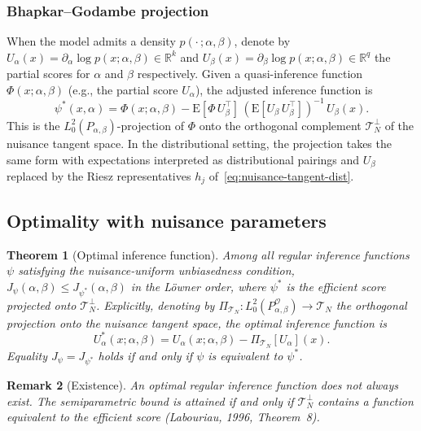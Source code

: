 \documentclass[11pt,a4paper]{article}
\newtheorem{theorem}{Theorem}[section]
\newtheorem{remark}[theorem]{Remark}
\newcommand{\E}{\mathrm{E}}
\newcommand{\R}{\mathbb{R}}
\newcommand{\eg}{{e.g.}, }
\begin{document}
\subsubsection*{Bhapkar--Godambe projection}

When the model admits a density $p(\cdot\,; \alpha, \beta)$, denote by
$U_\alpha(x) = \partial_\alpha \log p(x; \alpha, \beta) \in \R^k$
and $U_\beta(x) = \partial_\beta \log p(x; \alpha, \beta) \in \R^q$
the partial scores for $\alpha$ and $\beta$ respectively.
Given a quasi-inference function $\Phi(x; \alpha, \beta)$ (\eg the
partial score $U_\alpha$), the adjusted inference function is
\[
\psi^*(x, \alpha)
= \Phi(x; \alpha, \beta)
- \E[\Phi\,U_\beta^\top]\,(\E[U_\beta\,U_\beta^\top])^{-1}\,U_\beta(x).
\]
This is the $L^2_0(P_{\alpha,\beta})$-projection of $\Phi$ onto the
orthogonal complement $\mathcal T_N^\perp$ of the nuisance tangent space.
In the distributional setting, the projection takes the same form with
expectations interpreted as distributional pairings and $U_\beta$ replaced
by the Riesz representatives $h_j$
of~\eqref{eq:nuisance-tangent-dist}.

\subsection{Optimality with nuisance parameters}\label{subsec:nuisance-optimal}

\begin{theorem}[Optimal inference function]\label{thm:optimal-nuisance}
Among all regular inference functions $\psi$ satisfying the
nuisance-uniform unbiasedness condition,
$J_\psi(\alpha, \beta) \leq J_{\psi^*}(\alpha, \beta)$
in the L\"owner order, where $\psi^*$ is the efficient score projected
onto $\mathcal T_N^\perp$.  Explicitly, denoting by
$\Pi_{\mathcal T_N} : L^2_0(P_{\alpha,\beta}^{\mathcal O}) \to
\mathcal T_N$ the orthogonal projection onto the nuisance tangent space,
the optimal inference function is
\[
U^*_\alpha(x; \alpha, \beta)
= U_\alpha(x; \alpha, \beta)
- \Pi_{\mathcal T_N}[U_\alpha](x).
\]
Equality $J_\psi = J_{\psi^*}$ holds if and only if $\psi$ is
equivalent to $\psi^*$.
\end{theorem}

\begin{remark}[Existence]\label{rem:existence}
An optimal regular inference function does not always exist.  The
semiparametric bound is attained if and only if $\mathcal T_N^\perp$
contains a function equivalent to the efficient score (Labouriau, 1996,
Theorem~8).
\end{remark}
\end{document}
